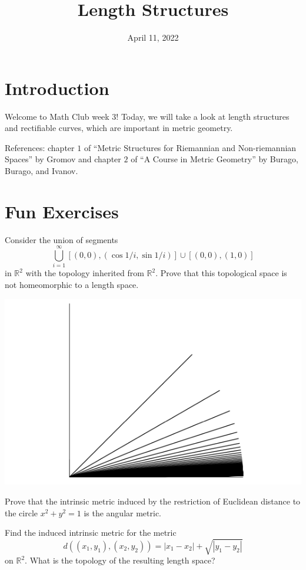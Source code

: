 \documentclass{article}
\title{Length Structures}
\author{}
\date{April 11, 2022}
\begin{document}
\section{Introduction} 
Welcome to Math Club week 3! Today, we will take a look at length structures and rectifiable curves, which are important in metric geometry.  

References: chapter $1$ of ``Metric Structures for Riemannian and Non-riemannian Spaces'' by Gromov and chapter $2$ of ``A Course in Metric Geometry'' by Burago, Burago, and Ivanov.

\section{Fun Exercises} 

\begin{exercise}
Consider the union of segments 
\[\bigcup_{i = 1}^{\infty} [(0, 0), (\cos 1/i, \sin 1/i)] \cup [(0, 0), (1, 0)]
\]
in $\mathbb{R}^{2}$ with the topology inherited from $\mathbb{R}^{2}$. Prove that this topological space is not homeomorphic to a length space. 
\end{exercise}

\begin{center}
\includegraphics[scale=0.5]{Pics/1.png}
\end{center}

\begin{exercise}
Prove that the intrinsic metric induced by the restriction of Euclidean distance to the circle $x^{2} + y^{2} = 1$ is the angular metric. 
\end{exercise}

\begin{exercise}
Find the induced intrinsic metric for the metric 
\[
d((x_{1}, y_{1}), (x_{2}, y_{2})) = |x_{1} - x_{2}| + \sqrt{|y_{1} - y_{2}|} \]
on $\mathbb{R}^{2}$. What is the topology of the resulting length space?
\end{exercise}
\end{document}
